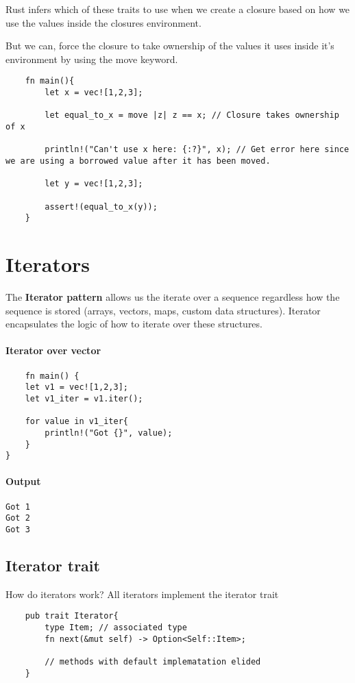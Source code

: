 Rust infers which of these traits to use when we create a closure based on how we use the values inside the closures environment. 

But we can, force the closure to take ownership of the values it uses inside it's environment by using the move keyword.\begin{lstlisting}
    fn main(){
        let x = vec![1,2,3];

        let equal_to_x = move |z| z == x; // Closure takes ownership of x

        println!("Can't use x here: {:?}", x); // Get error here since we are using a borrowed value after it has been moved.

        let y = vec![1,2,3];

        assert!(equal_to_x(y));
    }

\end{lstlisting}


\section{Iterators}
\begin{definition}
    The \textbf{Iterator pattern} allows us the iterate over a sequence regardless how the sequence is stored (arrays, vectors, maps, custom data structures). Iterator encapsulates the logic of how to iterate over these structures.
\end{definition}

\paragraph*{Iterator over vector}\begin{lstlisting}
    fn main() {
    let v1 = vec![1,2,3];
    let v1_iter = v1.iter();

    for value in v1_iter{
        println!("Got {}", value);
    }
}
\end{lstlisting}
\paragraph*{Output}\begin{lstlisting}
Got 1
Got 2
Got 3
\end{lstlisting}

\subsection{Iterator trait}
How do iterators work? All iterators implement the iterator trait\begin{lstlisting}
    pub trait Iterator{
        type Item; // associated type
        fn next(&mut self) -> Option<Self::Item>;

        // methods with default implematation elided
    }
\end{lstlisting}

